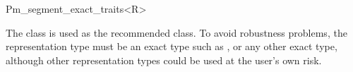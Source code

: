 
\ccRefPageBegin


\begin{ccRefClass}{Pm_segment_exact_traits<R>}
    
\ccDefinition 
    The class 
    is used as the recommended class. To avoid robustness problems, 
    the representation type  must be an exact type such as
    ,
     or any other exact type,
    although other representation types could be used at the user's own risk.

 
\ccIsModel

    


     
 
\end{ccRefClass} %

\ccRefPageEnd
